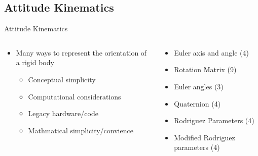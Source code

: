 
\subsection{Attitude Kinematics}
\begin{frame}[noframenumbering]{Attitude Kinematics}
\label{slide:attitude_kinematics}

\begin{columns}
\begin{column}{0.5\textwidth}
\begin{itemize}
    \item Many ways to represent the orientation of a rigid body
    \begin{itemize}
        \item Conceptual simplicity
        \item Computational considerations
        \item Legacy hardware/code
        \item Mathmatical simplicity/convience
    \end{itemize}
\end{itemize}
\end{column}
\pause
\begin{column}{0.5\textwidth}
    \begin{itemize}
        \item Euler axis and angle (4)
        \item Rotation Matrix (9)
        \item Euler angles (3)
        \item Quaternion (4)
        \item Rodriguez Parameters (4)
        \item Modified Rodriguez parameters (4)
    \end{itemize}
\end{column}
\end{columns}
\end{frame}

